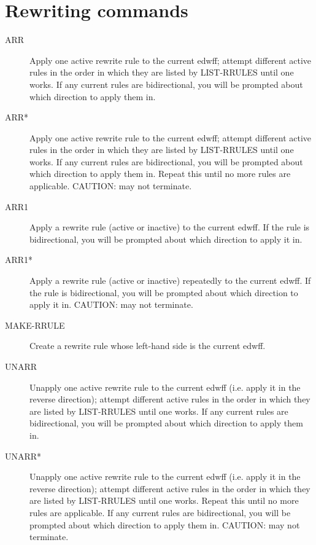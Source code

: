 \section{Rewriting commands}

\begin{description} 
\item[ARR]  
Apply one active rewrite rule to the current edwff; attempt 
different active rules in the order in which they are listed by 
LIST-RRULES until one works. If any current rules are 
bidirectional, you will be prompted about which direction to 
apply them in.

\item[ARR*]  
Apply one active rewrite rule to the current edwff; attempt 
different active rules in the order in which they are listed by 
LIST-RRULES until one works. If any current rules are 
bidirectional, you will be prompted about which direction to 
apply them in. Repeat this until no more rules
are applicable. CAUTION: may not terminate.

\item[ARR1]  
Apply a rewrite rule (active or inactive) to the 
current edwff. If the rule is bidirectional, you will be 
prompted about which direction to apply it in.

\item[ARR1*]  
Apply a rewrite rule (active or inactive) repeatedly 
to the current edwff. If the rule is bidirectional, you will 
be prompted about which direction to apply it in.
CAUTION: may not terminate.

\item[MAKE-RRULE]  
Create a rewrite rule whose left-hand side is 
the current edwff.

\item[UNARR]  
Unapply one active rewrite rule to the current edwff (i.e. apply
it in the reverse direction); attempt different active rules in the 
order in which they are listed by LIST-RRULES until one works.
If any current rules are bidirectional, you will be prompted 
about which direction to apply them in.

\item[UNARR*]  
Unapply one active rewrite rule to the current edwff (i.e. 
apply it in the reverse direction); attempt different active rules in 
the order in which they are listed by LIST-RRULES until one works. 
Repeat this until no more rules are applicable. If any current rules
are bidirectional, you will be prompted about which direction to 
apply them in. CAUTION: may not terminate.


\end{description}
